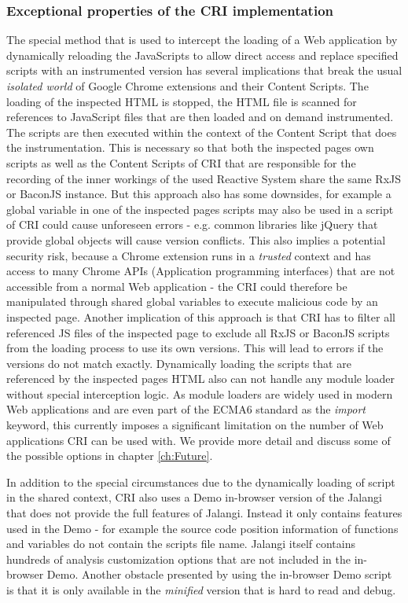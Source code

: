 	\subsubsection{Exceptional properties of the CRI implementation}
	The special method that is used to intercept the loading of a Web application by dynamically reloading the JavaScripts to allow direct access and replace specified scripts with an instrumented version has several implications that break the usual \emph{isolated world} \cite{GoogleApiContentScripts} of Google Chrome extensions and their Content Scripts. The loading of the inspected HTML is stopped, the HTML file is scanned for references to JavaScript files that are then loaded and on demand instrumented. The scripts are then executed within the context of the Content Script that does the instrumentation. This is necessary so that both the inspected pages own scripts as well as the Content Scripts of CRI that are responsible for the recording of the inner workings of the used Reactive System share the same RxJS or BaconJS instance. But this approach also has some downsides, for example a global variable in one of the inspected pages scripts may also be used in a script of CRI could cause unforeseen errors - e.g. common libraries like jQuery \cite{jQuery} that provide global objects will cause version conflicts. This also implies a potential security risk, because a Chrome extension runs in a \emph{trusted} context and has access to many Chrome APIs (Application programming interfaces) that are not accessible from a normal Web application - the CRI could therefore be manipulated through shared global variables to execute malicious code by an inspected page.
	Another implication of this approach is that CRI has to filter all referenced JS files of the inspected page to exclude all RxJS or BaconJS scripts from the loading process to use its own versions. This will lead to errors if the versions do not match exactly.
	Dynamically loading the scripts that are referenced by the inspected pages HTML also can not handle any module loader without special interception logic. As module loaders are widely used in modern Web applications and are even part of the ECMA6 \cite{ECMA6import} standard as the \emph{import} keyword, this currently imposes a significant limitation on the number of Web applications CRI can be used with. We provide more detail and discuss some of the possible options in chapter \ref{ch:Future}.
	
	
	In addition to the special circumstances due to the dynamically loading of script in the shared context, CRI also uses a Demo \cite{JalangiDemo} in-browser version of the Jalangi \cite{Jalangi} that does not provide the full features of Jalangi. Instead it only contains features used in the Demo - for example the source code position information of functions and variables do not contain the scripts file name. Jalangi itself contains hundreds of analysis customization options that are not included in the in-browser Demo. Another obstacle presented by using the in-browser Demo script is that it is only available in the \emph{minified} version that is hard to read and debug.
	
